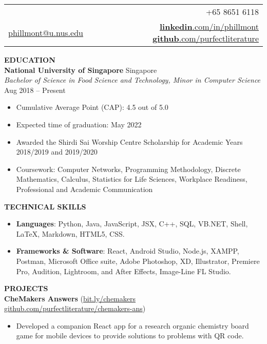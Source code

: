 \documentclass[a4paper, 11pt]{article}
\makeatletter
\newcommand{\interspace}{\vspace{7pt}}
\newcommand{\name}{Phillmont Muktar}
\newcommand{\cname}{\begin{CJK*}{UTF8}{zhsong}郑传期\end{CJK*}}
\newcommand{\tel}{+65 8651 6118}
\newcommand{\email}{\href{mailto:phillmont@u.nus.edu}{phillmont@u.nus.edu}}
\newcommand{\linkedin}{\href{http://linkedin.com/in/phillmont}{\textbf{linkedin}.com/in/phillmont}}
\newcommand{\github}{\href{http://github.com/purfectliterature}{\textbf{github}.com/purfectliterature}}
\makeatother
\begin{document}
	\sffamily
	
	\begin{tabularx}{\linewidth}{@{}X r@{}}
		{\Large \textbf{\name, \cname}} & \tel\\
		\email & \linkedin{} \textbar\textbar \space \github
	\end{tabularx}

	\interspace

	\textbf{\large EDUCATION} \hrulefill \\
	\textbf{National University of Singapore} \hfill Singapore\\
	\textit{Bachelor of Science in Food Science and Technology, Minor in Computer Science} \hfill Aug 2018 -- Present
	\begin{itemize}[leftmargin=*, noitemsep, topsep=0pt]
		\item Cumulative Average Point (CAP): 4.5 out of 5.0
		\item Expected time of graduation: May 2022
		\item Awarded the Shirdi Sai Worship Centre Scholarship for Academic Years 2018/2019 and 2019/2020
		\item Coursework: Computer Networks, Programming Methodology, Discrete Mathematics, Calculus, Statistics for Life Sciences, Workplace Readiness, Professional and Academic Communication
	\end{itemize}
	
	\interspace
	
	\textbf{\large TECHNICAL SKILLS} \hrulefill
	\begin{itemize}[leftmargin=*, noitemsep, topsep=0pt]
		\item \textbf{Languages}: Python, Java, JavaScript, JSX, C++, SQL, VB.NET, Shell, \LaTeX, Markdown, HTML5, CSS.
		\item \textbf{Frameworks \& Software}: React, Android Studio, Node.js, XAMPP, Postman, Microsoft Office suite, Adobe Photoshop, XD, Illustrator, Premiere Pro, Audition, Lightroom, and After Effects, Image-Line FL Studio.
	\end{itemize}

	\interspace
	
	\textbf{\large PROJECTS} \hrulefill \\
	\textbf{CheMakers Answers} (\href{http://bit.ly/chemakers}{bit.ly/chemakers} \textbar\space \href{http://github.com/purfectliterature/chemakers-ans}{github.com/purfectliterature/chemakers-ans})
	\begin{itemize}[leftmargin=*, noitemsep, topsep=0pt]
		\item Developed a companion React app for a research organic chemistry board game for mobile devices to provide solutions to problems with QR code.
	\end{itemize}
\end{document}

